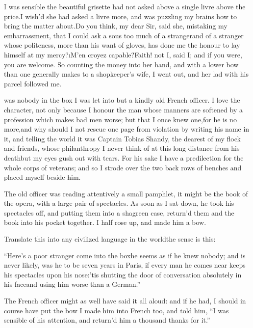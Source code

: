 \documentclass[twoside]{article}
\begin{document}
I was sensible the beautiful grisette had not asked above a single livre
above the price.\tsk I wish’d she had asked a livre more, and was puzzling my
brains how to bring the matter about.\tsk Do you think, my dear Sir, said
she, mistaking my embarrassment, that I could ask a sous too much of a
stranger\tsk and of a stranger whose politeness, more than his want of
gloves, has done me the honour to lay himself at my mercy?\tsk \i{M’en croyez
capable}?\tsk Faith! not I, said I; and if you were, you are welcome.  So
counting the money into her hand, and with a lower bow than one generally
makes to a shopkeeper’s wife, I went out, and her lad with his parcel
followed me.






 was nobody in the box I was let into but a kindly old French
officer.  I love the character, not only because I honour the man whose
manners are softened by a profession which makes bad men worse; but that
I once knew one,\tsk for he is no more,\tsk and why should I not rescue one page
from violation by writing his name in it, and telling the world it was
Captain Tobias Shandy, the dearest of my flock and friends, whose
philanthropy I never think of at this long distance from his death\tsk but my
eyes gush out with tears.  For his sake I have a predilection for the
whole corps of veterans; and so I strode over the two back rows of
benches and placed myself beside him.

The old officer was reading attentively a small pamphlet, it might be the
book of the opera, with a large pair of spectacles.  As soon as I sat
down, he took his spectacles off, and putting them into a shagreen case,
return’d them and the book into his pocket together.  I half rose up, and
made him a bow.

Translate this into any civilized language in the world\tsk the sense is
this:

“Here’s a poor stranger come into the box\tsk he seems as if he knew nobody;
and is never likely, was he to be seven years in Paris, if every man he
comes near keeps his spectacles upon his nose:\tsk ’tis shutting the door of
conversation absolutely in his face\tsk and using him worse than a German.”

The French officer might as well have said it all aloud: and if he had, I
should in course have put the bow I made him into French too, and told
him, “I was sensible of his attention, and return’d him a thousand thanks
for it.”
\end{document}
